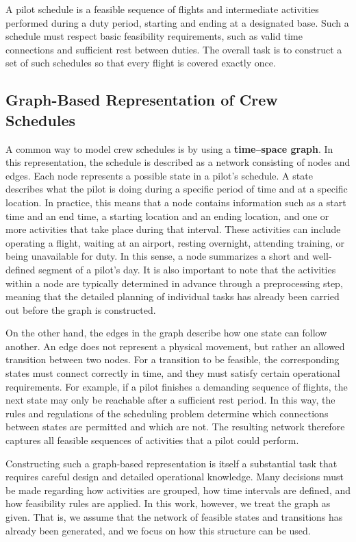 \documentclass{book}
\theoremstyle{definition}
\numberwithin{algorithm_}{chapter}
\begin{document}
{A pilot schedule is a feasible sequence of flights and intermediate activities performed during a duty period, starting and ending at a designated base. Such a schedule must respect basic feasibility requirements, such as valid time connections and sufficient rest between duties. The overall task is to construct a set of such schedules so that every flight is covered exactly once.


\subsection{Graph-Based Representation of Crew Schedules}

A common way to model crew schedules is by using a \textbf{time--space graph}. In this representation, the schedule is described as a network consisting of nodes and edges. Each node represents a possible state in a pilot's schedule. A state describes what the pilot is doing during a specific period of time and at a specific location. In practice, this means that a node contains information such as a start time and an end time, a starting location and an ending location, and one or more activities that take place during that interval. These activities can include operating a flight, waiting at an airport, resting overnight, attending training, or being unavailable for duty. In this sense, a node summarizes a short and well-defined segment of a pilot's day. It is also important to note that the activities within a node are typically determined in advance through a preprocessing step, meaning that the detailed planning of individual tasks has already been carried out before the graph is constructed.

On the other hand, the edges in the graph describe how one state can follow another. An edge does not represent a physical movement, but rather an allowed transition between two nodes. For a transition to be feasible, the corresponding states must connect correctly in time, and they must satisfy certain operational requirements. For example, if a pilot finishes a demanding sequence of flights, the next state may only be reachable after a sufficient rest period. In this way, the rules and regulations of the scheduling problem determine which connections between states are permitted and which are not. The resulting network therefore captures all feasible sequences of activities that a pilot could perform.

\bigskip

Constructing such a graph-based representation is itself a substantial task that requires careful design and detailed operational knowledge. Many decisions must be made regarding how activities are grouped, how time intervals are defined, and how feasibility rules are applied. In this work, however, we treat the graph as given. That is, we assume that the network of feasible states and transitions has already been generated, and we focus on how this structure can be used.

}
\end{document}
